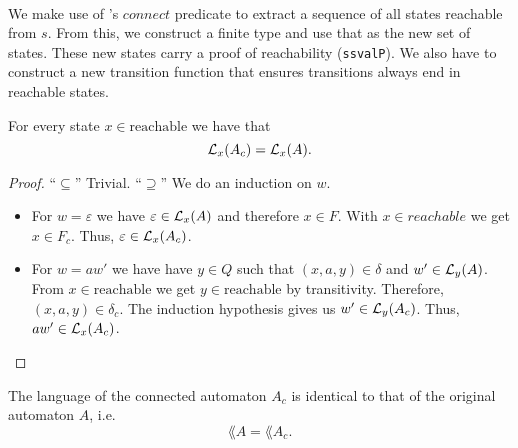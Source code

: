 \paragraph{}
We make use of \ssreflect's $connect$ predicate to extract a sequence of all states reachable from $s$. 
From this, we construct a finite type and use that as the new set of states. 
These new states carry a proof of reachability (\lstinline{ssvalP}).
We also have to construct a new transition function that ensures transitions always end in reachable states.


\begin{lemma}
    \label{dfa_connected_correct'}
    For every state $x \in \mathrm{reachable}$ we have that
    \begin{equation*}
        \mathcal{L}_{x}(A_c) = \mathcal{L}_{x}(A).
    \end{equation*}
\end{lemma}
\begin{proof}
    ``$\subseteq$'' Trivial.
    ``$\supseteq$''
    We do an induction on $w$.
    \begin{itemize}
        \item
            For $w = \varepsilon$ we have $\varepsilon \in \mathcal{L}_{x}(A)$ and therefore $x \in F$. 
            With $x \in reachable$ we get $x \in F_c$. 
            Thus, $\varepsilon \in \mathcal{L}_{x}(A_c)$.
        \item
            For $w = a w'$ we have have $y \in Q$ such that $(x, a, y) \in \delta$ and $w' \in \mathcal{L}_{y}(A)$.
            From $x \in \mathrm{reachable}$ we get $y \in \mathrm{reachable}$ by transitivity.
            Therefore, $(x,a,y) \in \delta_c$.
            The induction hypothesis gives us $w' \in \mathcal{L}_{y}(A_c)$. 
            Thus, $a w' \in \mathcal{L}_{x}(A_c)$.
    \end{itemize}
\end{proof}

\begin{theorem}
    \label{dfa_connected_correct}
    The language of the connected automaton $A_c$ is identical to that of the original automaton $A$, i.e.
    \begin{equation*}
        \lang{A} = \lang{A_c}.        
    \end{equation*}
\end{theorem}

